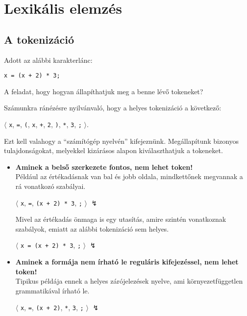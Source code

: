 \chapter{Lexikális elemzés}

\section{A tokenizáció}

Adott az alábbi karakterlánc:
\begin{center}
	\texttt{x = (x + 2) * 3;}
\end{center}
A feladat, hogy hogyan állapíthatjuk meg a benne lévő tokeneket?

Számunkra ránézésre nyilvánvaló, hogy a helyes tokenizáció a következő:
\begin{center}
	$\langle$ \texttt{x}, \texttt{=}, \texttt{(}, \texttt{x}, \texttt{+}, \texttt{2}, \texttt{)}, \texttt{*}, \texttt{3}, \texttt{;} $\rangle$.
\end{center}

Ezt kell valahogy a ``számítógép nyelvén'' kifejeznünk. Megállapítunk bizonyos tulajdonságokat, melyekkel kizárásos alapon kiválaszthatjuk a tokeneket.
\begin{itemize}
	\item \textbf{Aminek a belső szerkezete fontos, nem lehet token!} \\
	Például az értékadásnak van bal és jobb oldala, mindkettőnek megvannak a rá vonatkozó szabályai. 
	\begin{center}
		$\langle$ \texttt{x}, \texttt{=}, \texttt{(x + 2) * 3}, \texttt{;} $\rangle$ $\lightning$
	\end{center}
	
	Mivel az értékadás önmaga is egy utasítás, amire szintén vonatkoznak szabályok, emiatt az alábbi tokenizáció sem helyes.
	\begin{center}
		$\langle$ \texttt{x = (x + 2) * 3}, \texttt{;} $\rangle$ $\lightning$
	\end{center}
	
	\item \textbf{Aminek a formája nem írható le reguláris kifejezéssel, nem lehet token!} \\
	Tipikus példája ennek a helyes zárójelezések nyelve, ami környezetfüggetlen grammatikával írható le.
	\begin{center}
		$\langle$ \texttt{x}, \texttt{=}, \texttt{(x + 2)}, \texttt{*}, \texttt{3}, \texttt{;} $\rangle$ $\lightning$
	\end{center}
\end{itemize}


